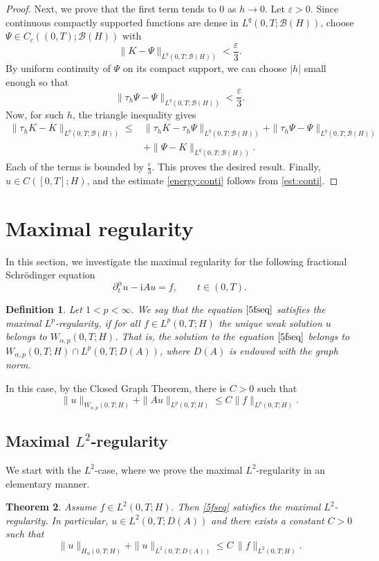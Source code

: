 \documentclass[reqno]{amsart}
\newtheorem{theorem}{Theorem}[section]
\newtheorem{defn}[theorem]{Definition}
\numberwithin{equation}{section}
\begin{document}
\begin{proof}
	Next, we prove that the first term tends to $0$ as $h\to 0$. Let $\varepsilon>0$. Since continuous compactly supported functions are dense in $L^q(0, T;\mathcal{B}(H))$, choose $\Psi \in C_c((0, T) ; \mathcal{B}(H))$ with
	$$
	\|K-\Psi\|_{L^q(0, T;\mathcal{B}(H))}<\frac{\varepsilon}{3}.
	$$
    By uniform continuity of $\Psi$ on its compact support, we can choose $|h|$ small enough so that
	$$
	\|\tau_h\Psi-\Psi\|_{L^q(0, T;\mathcal{B}(H))}<\frac{\varepsilon}{3}.
	$$
	Now, for such $h$, the triangle inequality gives
	\begin{align*}
		\|\tau_h K-K\|_{L^q(0, T;\mathcal{B}(H))}\le& \|\tau_h K-\tau_h \Psi\|_{L^q(0, T;\mathcal{B}(H))} + \|\tau_h \Psi -\Psi\|_{L^q(0, T;\mathcal{B}(H))}\\
		&+ \|\Psi -K\|_{L^q(0, T;\mathcal{B}(H))}.
	\end{align*}
	Each of the terms is bounded by $\frac{\varepsilon}{3}$. This proves the desired result. 
    Finally, $u\in C([0,T];H)$, and the estimate \eqref{energy:conti} follows from \eqref{est:conti}.
\end{proof}

\section{Maximal regularity}\label{sec5}
In this section, we investigate the maximal regularity for the following fractional Schr\"odinger equation
\begin{equation}\label{5fseq}
\partial_t^\alpha u -\mathrm{i} Au=f, \qquad t \in (0,T).
\end{equation}
\begin{defn}
Let $1<p<\infty$. We say that the equation $\eqref{5fseq}$ satisfies the maximal $L^p$-regularity, if for all $f\in L^p(0,T;H)$ the unique weak solution $u$ belongs to $W_{\alpha,p}(0,T;H)$. That is, the solution to the equation $\eqref{5fseq}$ belongs to $W_{\alpha,p}(0,T;H)\cap L^p(0,T;D(A))$, where $D(A)$ is endowed with the graph norm.
\end{defn}
In this case, by the Closed Graph Theorem, there is $C>0$ such that
\begin{equation}
\|u\|_{W_{\alpha,p}(0,T;H)}+\|Au\|_{L^p(0,T;H)} \le C \|f\|_{L^p(0,T;H)}.
\end{equation}

\subsection{Maximal $L^2$-regularity}\label{sec51}
We start with the $L^2$-case, where we prove the maximal $L^2$-regularity in an elementary manner.
\begin{theorem}\label{thmMR}
Assume $f\in L^2(0,T;H).$ Then \eqref{5fseq} satisfies the maximal $L^2$-regularity. In particular, $u\in L^2(0,T;D(A))$ and there exists a constant $C>0$ such that
\[
\|u\|_{H_{\alpha}(0,T;H)}+\|u\|_{L^2(0,T;D(A))}\le C\,\|f\|_{L^2(0,T;H)}.
\]
\end{theorem}
\end{document}

